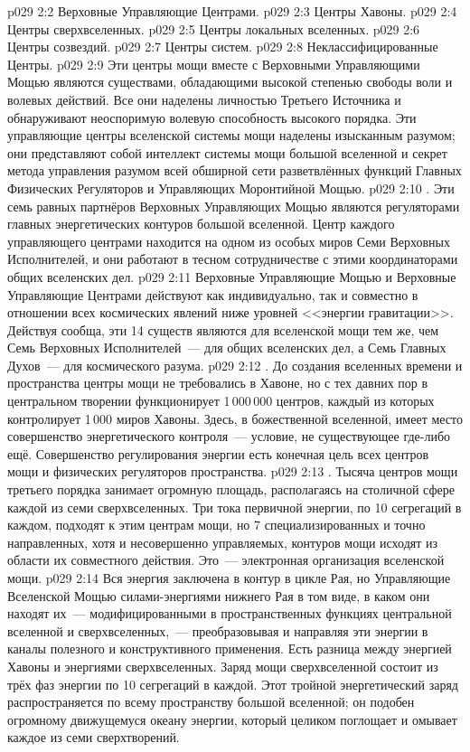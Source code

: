 \vs p029 2:2 Верховные Управляющие Центрами.
\vs p029 2:3 Центры Хавоны.
\vs p029 2:4 Центры сверхвселенных.
\vs p029 2:5 Центры локальных вселенных.
\vs p029 2:6 Центры созвездий.
\vs p029 2:7 Центры систем.
\vs p029 2:8 Неклассифицированные Центры.
\vs p029 2:9 \pc Эти центры мощи вместе с Верховными Управляющими Мощью являются существами, обладающими высокой степенью свободы воли и волевых действий. Все они наделены личностью Третьего Источника и обнаруживают неоспоримую волевую способность высокого порядка. Эти управляющие центры вселенской системы мощи наделены изысканным разумом; они представляют собой интеллект системы мощи большой вселенной и секрет метода управления разумом всей обширной сети разветвлённых функций Главных Физических Регуляторов и Управляющих Моронтийной Мощью.
\vs p029 2:10 . Эти семь равных партнёров Верховных Управляющих Мощью являются регуляторами главных энергетических контуров большой вселенной. Центр каждого управляющего центрами находится на одном из особых миров Семи Верховных Исполнителей, и они работают в тесном сотрудничестве с этими координаторами общих вселенских дел.
\vs p029 2:11 Верховные Управляющие Мощью и Верховные Управляющие Центрами действуют как индивидуально, так и совместно в отношении всех космических явлений ниже уровней <<энергии гравитации>>. Действуя сообща, эти 14 существ являются для вселенской мощи тем же, чем Семь Верховных Исполнителей~--- для общих вселенских дел, а Семь Главных Духов~--- для космического разума.
\vs p029 2:12 . До создания вселенных времени и пространства центры мощи не требовались в Хавоне, но с тех давних пор в центральном творении функционирует 1\,000\,000 центров, каждый из которых контролирует 1\,000 миров Хавоны. Здесь, в божественной вселенной, имеет место совершенство энергетического контроля~--- условие, не существующее где\hyp{}либо ещё. Совершенство регулирования энергии есть конечная цель всех центров мощи и физических регуляторов пространства.
\vs p029 2:13 . Тысяча центров мощи третьего порядка занимает огромную площадь, располагаясь на столичной сфере каждой из семи сверхвселенных. Три тока первичной энергии, по 10 сегрегаций в каждом, подходят к этим центрам мощи, но 7 специализированных и точно направленных, хотя и несовершенно управляемых, контуров мощи исходят из области их совместного действия. Это~--- электронная организация вселенской мощи.
\vs p029 2:14 Вся энергия заключена в контур в цикле Рая, но Управляющие Вселенской Мощью  силами\hyp{}энергиями нижнего Рая в том виде, в каком они находят их~--- модифицированными в пространственных функциях центральной вселенной и сверхвселенных,~--- преобразовывая и направляя эти энергии в каналы полезного и конструктивного применения. Есть разница между энергией Хавоны и энергиями сверхвселенных. Заряд мощи сверхвселенной состоит из трёх фаз энергии по 10 сегрегаций в каждой. Этот тройной энергетический заряд распространяется по всему пространству большой вселенной; он подобен огромному движущемуся океану энергии, который целиком поглощает и омывает каждое из семи сверхтворений.
